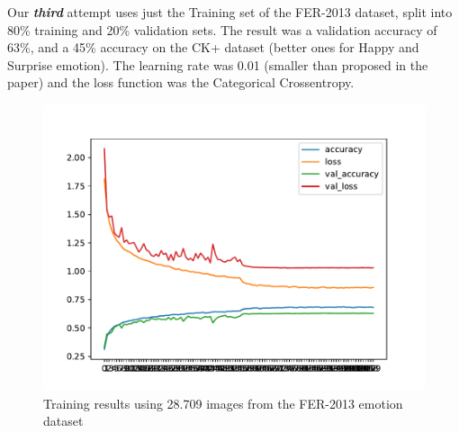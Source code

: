 \documentclass[runningheads,a4paper,11pt]{report}
\begin{document}
Our \textbf{\emph{third}} attempt uses just the Training set of the FER-2013 dataset, split into 80\% training and 20\% validation sets. The result was a validation accuracy of 63\%, and a 45\% accuracy on the CK+ dataset (better ones for Happy and Surprise emotion). The learning rate was 0.01 (smaller than proposed in the paper) and the loss function was the Categorical Crossentropy.
\begin{figure}[htbp]
\begin{center}
	\includegraphics[scale=0.8]{Fig/fer_training_28k_001.pdf}
	\caption{Training results using 28.709 images from the FER-2013 emotion dataset}
	\label{fer_training_28k_001}
\end{center}
\end{figure}
\end{document}
